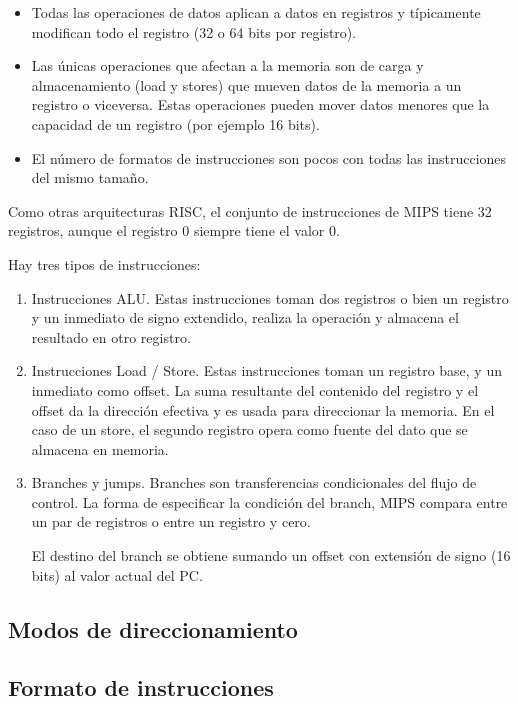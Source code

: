 \begin{itemize}
\item Todas las operaciones de datos aplican a datos en registros y típicamente modifican todo el registro (32 o 64 bits por registro).
\item Las únicas operaciones que afectan a la memoria son de carga y almacenamiento (load y stores) que mueven datos de la memoria a un registro o viceversa. Estas operaciones pueden mover datos menores que la capacidad de un registro (por ejemplo 16 bits).
\item El número de formatos de instrucciones son pocos con todas las instrucciones del mismo tamaño.
\end{itemize}

Como otras arquitecturas RISC, el conjunto de instrucciones de MIPS tiene 32 registros, aunque el registro 0 siempre tiene el valor 0. 

Hay tres tipos de instrucciones:

\begin{enumerate}
\item Instrucciones ALU. Estas instrucciones toman dos registros o bien un registro y un inmediato de signo extendido, realiza la operación y almacena el resultado en otro registro.

\item Instrucciones Load / Store. Estas instrucciones toman un registro base, y un inmediato como offset. La suma resultante del contenido del registro y el offset da la dirección efectiva y es usada para direccionar la memoria. En el caso de un store, el segundo registro opera como fuente del dato que se almacena en memoria.

\item Branches  y  jumps. Branches son transferencias condicionales del flujo de control. La forma de especificar la condición del branch, MIPS compara entre un par de registros o entre un registro y cero.

El destino del branch se obtiene sumando un offset con extensión de signo (16 bits) al valor actual del PC.
\end{enumerate}

\subsection{Modos de direccionamiento}
\subsection{Formato de instrucciones}

